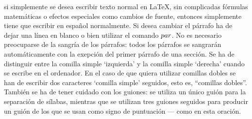 \documentclass[a4paper, 10pt]{letter}
\begin{document}
 si simplemente se desea escribir texto normal en LaTeX,
 sin complicadas fórmulas matemáticas o efectos especiales
 como cambios de fuente, entonces simplemente tiene que escribir
 en español normalmente.
 Si desea cambiar el párrafo ha de dejar una línea en blanco o bien
 utilizar el comando $\\par$.
 No es necesario preocuparse de la sangría de los párrafos:
 todos los párrafos se sangrarán automáticamente con la exepción
 del primer párrafo de una sección.
 Se ha de distinguir entre la comilla simple `izquierda'
 y la comilla simple `derecha' cuando se escribe en el ordenador.
 En el caso de que quiera utilizar comillas dobles se han de 
 escribir dos caracteres `comilla simple'  seguidos, esto es,
 ``comillas dobles''.
 También se ha de tener cuidado con los guiones: se utiliza un único
 guión para la separación de sílabas, mientras que se utilizan
 tres guiones seguidos para producir un guión de los que se usan
 como signo de puntuación --- como en esta oración.
\end{document}
